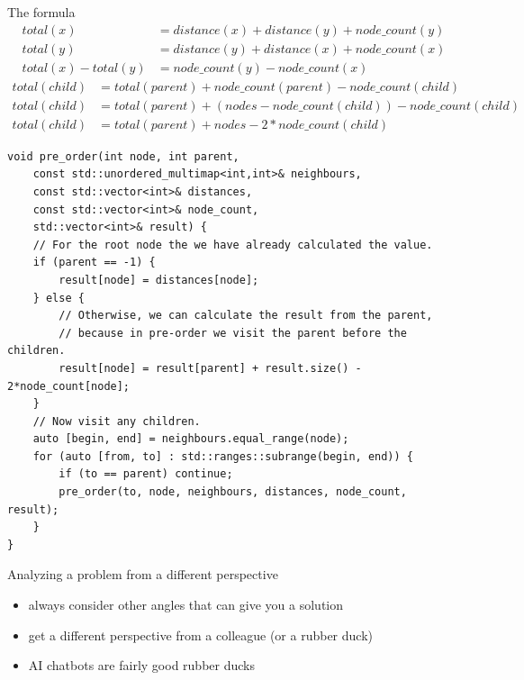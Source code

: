 \documentclass[aspectratio=169]{beamer}
\begin{document}
\begin{frame}{The formula}
  \begin{align*}
  total(x) & = distance(x) + distance(y) + node\_count(y)\\
  total(y) & = distance(y) + distance(x) + node\_count(x)\\
  total(x) - total(y) & = node\_count(y) - node\_count(x)
  \end{align*}
  \pause
  \begin{align*}
  total(child) & = total(parent) + node\_count(parent) - node\_count(child)\\
  total(child) & = total(parent) + (nodes - node\_count(child)) - node\_count(child)\\
  total(child) & = total(parent) + nodes - 2*node\_count(child)
  \end{align*}
\end{frame}

\begin{frame}[fragile]{}
\small
\begin{verbatim}
void pre_order(int node, int parent, 
    const std::unordered_multimap<int,int>& neighbours, 
    const std::vector<int>& distances,
    const std::vector<int>& node_count,
    std::vector<int>& result) {
    // For the root node the we have already calculated the value.
    if (parent == -1) {
        result[node] = distances[node];
    } else {
        // Otherwise, we can calculate the result from the parent,
        // because in pre-order we visit the parent before the children.
        result[node] = result[parent] + result.size() - 2*node_count[node];
    }
    // Now visit any children.
    auto [begin, end] = neighbours.equal_range(node);
    for (auto [from, to] : std::ranges::subrange(begin, end)) {
        if (to == parent) continue;
        pre_order(to, node, neighbours, distances, node_count, result);
    }
}
\end{verbatim}
\end{frame}

\begin{frame}{Analyzing a problem from a different perspective}
  \begin{itemize}
    \item always consider other angles that can give you a solution
    \item get a different perspective from a colleague (or a rubber duck)
    \item AI chatbots are fairly good rubber ducks
  \end{itemize}
\end{frame}
\end{document}
